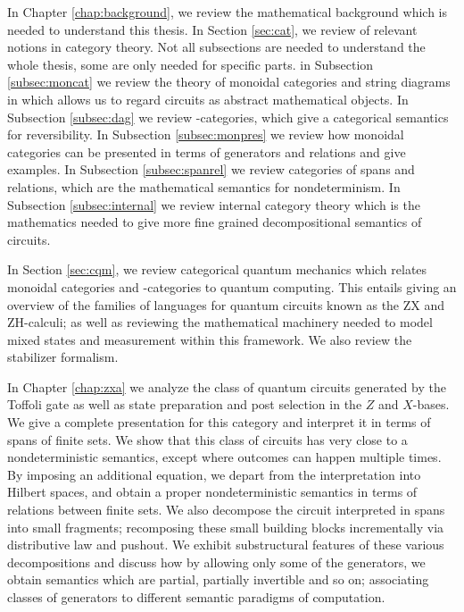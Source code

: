 In Chapter \ref{chap:background}, we review the mathematical background which is needed to understand this thesis.   In Section \ref{sec:cat}, we review of relevant notions in category theory. Not all subsections are needed to understand the whole thesis, some are only needed for specific parts.  in Subsection \ref{subsec:moncat} we review the theory of monoidal categories and string diagrams in which allows us to regard circuits as abstract mathematical objects.  In Subsection \ref{subsec:dag} we review \dag-categories, which give a categorical semantics for reversibility. In Subsection \ref{subsec:monpres} we review how monoidal categories can be presented in terms of generators and relations and give examples.  In Subsection \ref{subsec:spanrel} we review categories of spans and relations, which are the mathematical semantics for  nondeterminism.  In Subsection \ref{subsec:internal} we review internal category theory which is the mathematics needed to give more fine grained decompositional semantics of circuits.  

In Section \ref{sec:cqm}, we review  categorical quantum mechanics which relates monoidal categories and \dag-categories to quantum computing. This entails giving an overview of the families of languages for quantum circuits known as the  ZX and ZH-calculi; as well as reviewing the mathematical machinery needed to model mixed states and measurement within this framework.  We also review the stabilizer formalism.

In Chapter \ref{chap:zxa} we analyze the class of quantum circuits generated by the Toffoli gate as well as state preparation and post selection in the $Z$ and $X$-bases.  We give a complete presentation for this category and interpret it in terms of spans of finite sets.  We show that this class of circuits has very close to a nondeterministic semantics, except where outcomes can happen multiple times.  By imposing an additional equation, we depart from the interpretation into Hilbert spaces, and obtain a proper  nondeterministic semantics in terms of relations between finite sets. We also decompose the circuit interpreted in spans into small fragments; recomposing these small building blocks incrementally via distributive law and pushout.
We exhibit substructural features of these various decompositions and discuss how by allowing only some of the generators, we obtain semantics which are partial, partially invertible and so on; associating classes of generators to different semantic paradigms of computation.


